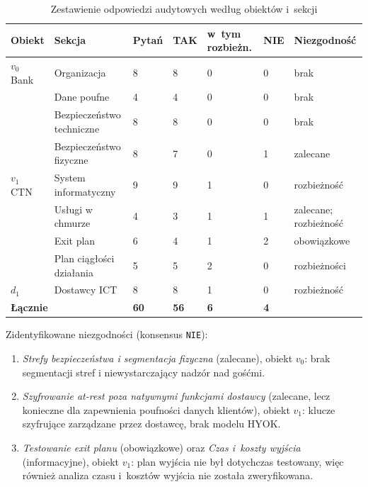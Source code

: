 \begin{table}[H]
\centering
\caption{Zestawienie odpowiedzi audytowych według obiektów i~sekcji}
\label{tab:podsumowanie-odpowiedzi}
\renewcommand{\arraystretch}{1.4}
\begin{tabular}{p{1.5cm}p{4.2cm}p{1.0cm}p{0.9cm}p{1.5cm}p{0.9cm}p{2.1cm}}
\toprule
\textbf{Obiekt} & \textbf{Sekcja} & \textbf{Pytań} & \textbf{TAK} & \textbf{w~tym rozbieżn.} & \textbf{NIE} & \textbf{Niezgodność} \\
\midrule
$v_0$ Bank & Organizacja & 8 & 8 & 0 & 0 & brak \\
 & Dane poufne & 4 & 4 & 0 & 0 & brak \\
 & Bezpieczeństwo techniczne & 8 & 8 & 0 & 0 & brak \\
 & Bezpieczeństwo fizyczne & 8 & 7 & 0 & 1 & zalecane \\
\midrule
$v_1$ CTN & System informatyczny & 9 & 9 & 1 & 0 & rozbieżność \\
 & Usługi w chmurze & 4 & 3 & 1 & 1 & zalecane; rozbieżność \\
 & Exit plan & 6 & 4 & 1 & 2 & obowiązkowe \\
 & Plan ciągłości działania & 5 & 5 & 2 & 0 & rozbieżności \\
\midrule
$d_1$ & Dostawcy ICT & 8 & 8 & 1 & 0 & rozbieżność \\
\midrule
\multicolumn{2}{l}{\textbf{Łącznie}} & \textbf{60} & \textbf{56} & \textbf{6} & \textbf{4} & \\
\bottomrule
\end{tabular}

\smallskip
\end{table}

Zidentyfikowane niezgodności (konsensus \texttt{NIE}):
\begin{enumerate}[label=(\roman*)]
  \item \textit{Strefy bezpieczeństwa i segmentacja fizyczna} (zalecane), obiekt $v_0$: brak segmentacji stref i niewystarczający nadzór nad gośćmi.
  \item \textit{Szyfrowanie at-rest poza natywnymi funkcjami dostawcy} (zalecane, lecz konieczne dla zapewnienia poufności danych klientów), obiekt $v_1$: klucze szyfrujące zarządzane przez dostawcę, brak modelu HYOK.
  \item \textit{Testowanie exit planu} (obowiązkowe) oraz \textit{Czas i~koszty wyjścia} (informacyjne), obiekt $v_1$: plan wyjścia nie był dotychczas testowany, więc również analiza czasu i~kosztów wyjścia nie została zweryfikowana.
\end{enumerate}

